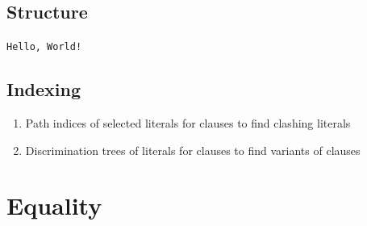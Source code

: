 
\subsection{Structure}

\begin{frame}
	\lstinline|Hello, World!|
	\end{frame}

\subsection{Indexing}

\begin{frame}
	\begin{enumerate}
		\item Path indices of selected literals for clauses to find clashing literals
		\item Discrimination trees of literals for clauses to find variants of clauses
	\end{enumerate}
	\end{frame}


%
%
%
%
%
%
%
%
%
%
%

\section{Equality}
%


%	
%	
%	
%	
%	
%	
%	
%	
%		
%		
%		
